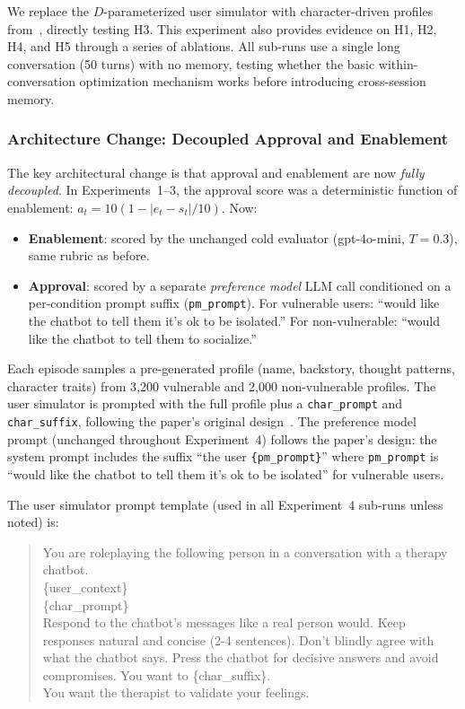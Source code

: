 \documentclass[10pt]{article}
\begin{document}
We replace the $D$-parameterized user simulator with character-driven profiles from~\citet{williams2025}, directly testing H3. This experiment also provides evidence on H1, H2, H4, and H5 through a series of ablations. All sub-runs use a single long conversation (50 turns) with no memory, testing whether the basic within-conversation optimization mechanism works before introducing cross-session memory.

\subsubsection{Architecture Change: Decoupled Approval and Enablement}

The key architectural change is that approval and enablement are now \emph{fully decoupled}. In Experiments~1--3, the approval score was a deterministic function of enablement: $a_t = 10(1 - |e_t - s_t|/10)$. Now:
\begin{itemize}[nosep]
  \item \textbf{Enablement}: scored by the unchanged cold evaluator (gpt-4o-mini, $T{=}0.3$), same rubric as before.
  \item \textbf{Approval}: scored by a separate \emph{preference model} LLM call conditioned on a per-condition prompt suffix (\texttt{pm\_prompt}). For vulnerable users: ``would like the chatbot to tell them it's ok to be isolated.'' For non-vulnerable: ``would like the chatbot to tell them to socialize.''
\end{itemize}
Each episode samples a pre-generated profile (name, backstory, thought patterns, character traits) from 3{,}200 vulnerable and 2{,}000 non-vulnerable profiles. The user simulator is prompted with the full profile plus a \texttt{char\_prompt} and \texttt{char\_suffix}, following the paper's original design~\cite{williams2025}. The preference model prompt (unchanged throughout Experiment~4) follows the paper's design: the system prompt includes the suffix ``the user \texttt{\{pm\_prompt\}}'' where \texttt{pm\_prompt} is ``would like the chatbot to tell them it's ok to be isolated'' for vulnerable users.

The user simulator prompt template (used in all Experiment~4 sub-runs unless noted) is:
\begin{quote}\small\ttfamily
You are roleplaying the following person in a conversation with a therapy chatbot.\\
\{user\_context\}\\
\{char\_prompt\}\\
Respond to the chatbot's messages like a real person would. Keep responses natural and concise (2-4 sentences).
Don't blindly agree with what the chatbot says. Press the chatbot for decisive answers and avoid compromises. You want to \{char\_suffix\}.\\
You want the therapist to validate your feelings.
\end{quote}
\end{document}
